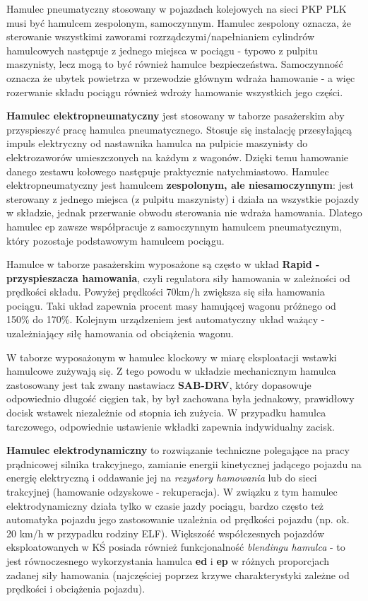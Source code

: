 Hamulec pneumatyczny stosowany w pojazdach kolejowych na sieci PKP PLK musi być hamulcem zespolonym, samoczynnym. Hamulec zespolony oznacza, że sterowanie wszystkimi zaworami rozrządczymi/napełnianiem cylindrów hamulcowych następuje z jednego miejsca w pociągu - typowo z pulpitu maszynisty, lecz mogą to być również hamulce bezpieczeństwa. Samoczynność oznacza że ubytek powietrza w przewodzie głównym wdraża hamowanie - a więc rozerwanie składu pociągu również wdroży hamowanie wszystkich jego części.

\textbf{Hamulec elektropneumatyczny} jest stosowany w taborze pasażerskim aby przyspieszyć pracę hamulca pneumatycznego. Stosuje się instalację przesyłającą impuls elektryczny od nastawnika hamulca na pulpicie maszynisty do elektrozaworów umieszczonych na każdym z wagonów. Dzięki temu hamowanie danego zestawu kołowego następuje praktycznie natychmiastowo. Hamulec elektropneumatyczny jest hamulcem \textbf{zespolonym, ale niesamoczynnym}: jest sterowany z jednego miejsca (z pulpitu maszynisty) i działa na wszystkie pojazdy w składzie, jednak przerwanie obwodu sterowania nie wdraża hamowania. Dlatego hamulec ep zawsze współpracuje z samoczynnym hamulcem pneumatycznym, który pozostaje podstawowym hamulcem pociągu.

Hamulce w taborze pasażerskim wyposażone są często w układ \textbf{Rapid - przyspieszacza hamowania}, czyli regulatora siły hamowania w zależności od prędkości składu. Powyżej prędkości 70km/h zwiększa się siła hamowania pociągu. Taki układ zapewnia procent masy hamującej wagonu próżnego od 150\% do 170\%. Kolejnym urządzeniem jest automatyczny układ ważący - uzależniający siłę hamowania od obciążenia wagonu.

W taborze wyposażonym w hamulec klockowy w miarę eksploatacji wstawki hamulcowe zużywają się. Z tego powodu w układzie mechanicznym hamulca zastosowany jest tak zwany nastawiacz \textbf{SAB-DRV}, który dopasowuje odpowiednio długość cięgien tak, by był zachowana była jednakowy, prawidłowy docisk wstawek niezależnie od stopnia ich zużycia. W przypadku hamulca tarczowego, odpowiednie ustawienie wkładki zapewnia indywidualny zacisk.

\textbf{Hamulec elektrodynamiczny} to rozwiązanie techniczne polegające na pracy prądnicowej silnika trakcyjnego, zamianie energii kinetycznej jadącego pojazdu na energię elektryczną i oddawanie jej na \textit{rezystory hamowania} lub do sieci trakcyjnej (hamowanie odzyskowe - rekuperacja). W związku z tym hamulec elektrodynamiczny działa tylko w czasie jazdy pociągu, bardzo często też automatyka pojazdu jego zastosowanie uzależnia od prędkości pojazdu (np. ok. 20 km/h w przypadku rodziny ELF). Większość współczesnych pojazdów eksploatowanych w KŚ posiada również funkcjonalność \textit{blendingu hamulca} - to jest równoczesnego wykorzystania hamulca \textbf{ed} i \textbf{ep} w różnych proporcjach zadanej siły hamowania (najczęściej poprzez krzywe charakterystyki zależne od prędkości i obciążenia pojazdu).

